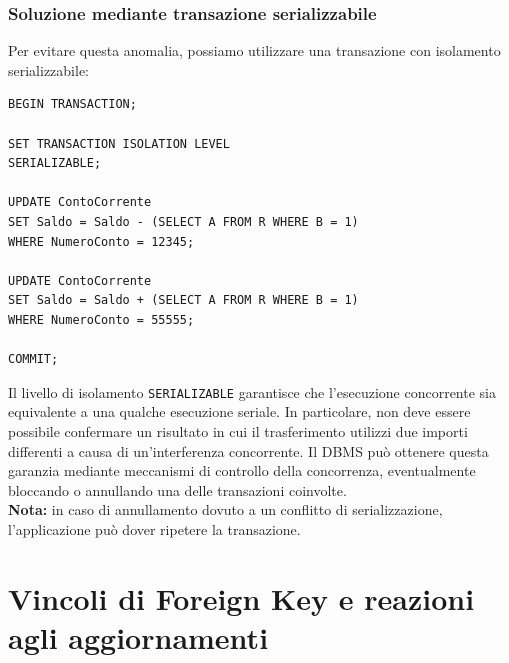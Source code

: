 \subsubsection{Soluzione mediante transazione serializzabile}
Per evitare questa anomalia, possiamo utilizzare
una transazione con isolamento serializzabile:
\begin{verbatim}
BEGIN TRANSACTION;

SET TRANSACTION ISOLATION LEVEL
SERIALIZABLE;

UPDATE ContoCorrente
SET Saldo = Saldo - (SELECT A FROM R WHERE B = 1)
WHERE NumeroConto = 12345;

UPDATE ContoCorrente
SET Saldo = Saldo + (SELECT A FROM R WHERE B = 1)
WHERE NumeroConto = 55555;

COMMIT;
\end{verbatim}
Il livello di isolamento \texttt{SERIALIZABLE}
garantisce che l'esecuzione concorrente sia
equivalente a una qualche esecuzione seriale.
In particolare, non deve essere possibile
confermare un risultato in cui il trasferimento
utilizzi due importi differenti a causa
di un'interferenza concorrente.
Il DBMS può ottenere questa garanzia mediante
meccanismi di controllo della concorrenza,
eventualmente bloccando o annullando
una delle transazioni coinvolte.\\
\textbf{Nota:} in caso di annullamento dovuto
a un conflitto di serializzazione, l'applicazione
può dover ripetere la transazione.

\section{Vincoli di Foreign Key e reazioni agli aggiornamenti}
